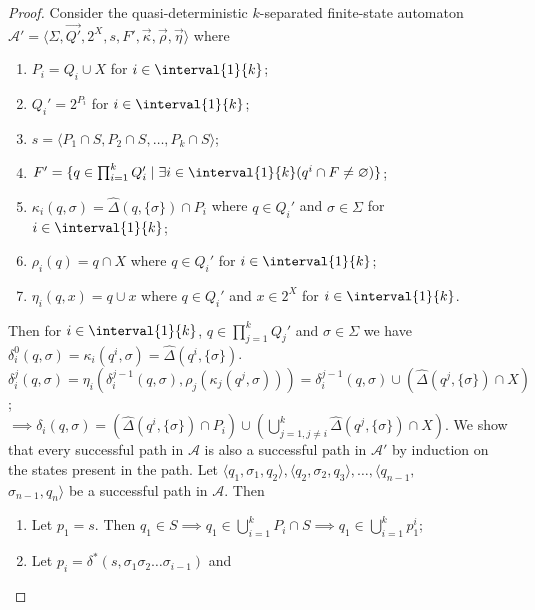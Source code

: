 \begin{proof}
	Consider the quasi-deterministic $k$-separated finite-state automaton
	$\mathcal{A'} = \langle \Sigma, \vec{Q'}, 2^X, s, F', \vec{\kappa},
	\vec{\rho}, \vec{\eta} \rangle$ where

	\begin{enumerate}
		\item $P_i = Q_i \cup X$ for $i \in \interval{1}{k}$;
		\item $Q_i' = 2^{P_i}$ for $i \in \interval{1}{k}$;
		\item $s = \langle P_1 \cap S, P_2 \cap S, \dots, P_k \cap S
			\rangle$;
		\item $F' = \{ q \in \prod_{i=1}^k{Q_i'} \mid
			\exists i \in \interval{1}{k} (q^i \cap F \neq
			\varnothing) \}$;
		\item $\kappa_i(q, \sigma) = \hat{\Delta}(q, \{ \sigma \})
			\cap P_i$ where $q \in Q_i'$ and $\sigma
			\in \Sigma$ for $i \in \interval{1}{k}$;
		\item $\rho_i(q) = q \cap X$ where $q \in Q_i'$ for $i \in
			\interval{1}{k}$;
		\item $\eta_i(q, x) = q \cup x$ where $q \in Q_i'$ and $x \in 2^X$
			for $i \in \interval{1}{k}$.
	\end{enumerate}
	Then for $i \in \interval{1}{k}$, $q \in \prod_{j=1}^k{Q_j'}$ and $\sigma \in \Sigma$ we have\\
	$\delta_i^0(q, \sigma) = \kappa_i(q^i, \sigma) = \hat{\Delta}(q^i, \{ \sigma \})$.\\
	$\delta_i^j(q, \sigma) = \eta_i(\delta_i^{j-1}(q, \sigma),
	\rho_j(\kappa_j(q^j, \sigma))) = \delta_i^{j-1}(q, \sigma) \cup (
	\hat{\Delta}(q^j, \{ \sigma \}) \cap X)$;\\
	$\implies \delta_i(q, \sigma) = (\hat{\Delta}(
			q^i, \{ \sigma \}) \cap P_i) \cup
			(\bigcup_{j = 1, j
			\neq i}^k{\hat{\Delta}(q^j, \{ \sigma \}) \cap X})$.
	\bigbreak
	We show that every successful path in $\mathcal{A}$ is also a successful
	path in $\mathcal{A'}$ by induction on the states present in the path.
	Let $\langle q_1, \sigma_1, q_2 \rangle, \langle q_2, \sigma_2, q_3 \rangle,
	\ldots, \langle q_{n-1},$\\
	$\sigma_{n-1}, q_n \rangle$ be a successful path in $\mathcal{A}$. Then
	\begin{enumerate}
		\item Let $p_1 = s$. Then $q_1 \in S \implies q_1 \in
			\bigcup_{i=1}^k{P_i \cap S} \implies q_1 \in
			\bigcup_{i=1}^k{p_1^i}$;
		\item Let $p_i = \delta^*(s, \sigma_1 \sigma_2 \ldots \sigma_{i-1})$ and

\end{enumerate}
\end{proof}

